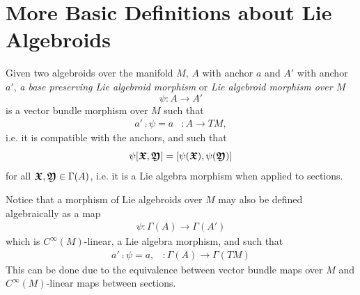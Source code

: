\section{More Basic Definitions about Lie Algebroids}
\begin{definition}  \label{defnMorph}
Given two algebroids over the manifold $M$, $A$ with anchor $a$ and $A'$ with anchor $a'$, \emph{a base preserving Lie algebroid morphism} or \emph{Lie algebroid morphism over $M$} 
\[\psi: A \to A'\]
is a vector bundle morphism over $M$ such that 
\begin{align}
    a' \comp \psi = a & : A \to TM,
\end{align}
i.e. it is compatible with the anchors, and such that 
\[\psi[\bm{\mathfrak{X}}, \bm{\mathfrak{Y}}] = [\psi(\bm{\mathfrak{X}}), \psi(\bm{\mathfrak{Y}})]\] 
for all $\bm{\mathfrak{X}}, \bm{\mathfrak{Y}} \in \Gamma(A)$, i.e. it is a Lie algebra morphism when applied to sections. 
\end{definition}

\begin{remark}
Notice that a morphism of Lie algebroids over $M$ may also be defined algebraically as a map
\begin{align*}
    \psi: \Gamma(A) \to \Gamma(A')
\end{align*}
which is $C^\infty(M)$-linear, a Lie algebra morphism, and such that
\begin{align*}
    a' \comp \psi = a, & :\Gamma(A) \to \Gamma(TM)
\end{align*}
This can be done due to the equivalence between vector bundle maps over $M$ and $C^\infty(M)$-linear maps between sections.
\end{remark}

